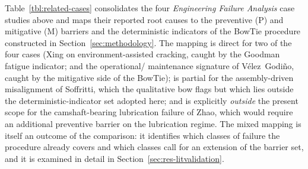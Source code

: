 Table~\ref{tbl:related-cases} consolidates the four
\textit{Engineering Failure Analysis} case studies above and maps
their reported root causes to the preventive (P) and mitigative (M)
barriers and the deterministic indicators of the BowTie procedure
constructed in Section~\ref{sec:methodology}. The mapping is direct
for two of the four cases (Xing on environment-assisted cracking,
caught by the Goodman fatigue indicator; and the operational/
maintenance signature of V\'elez~Godi\~no, caught by the mitigative
side of the BowTie); is partial for the assembly-driven misalignment
of Soffritti, which the qualitative bow flags but which lies outside
the deterministic-indicator set adopted here; and is explicitly
\emph{outside} the present scope for the camshaft-bearing
lubrication failure of Zhao, which would require an additional
preventive barrier on the lubrication regime. The mixed mapping is
itself an outcome of the comparison: it identifies which classes of
failure the procedure already covers and which classes call for an
extension of the barrier set, and it is examined in detail in
Section~\ref{sec:res-litvalidation}.

